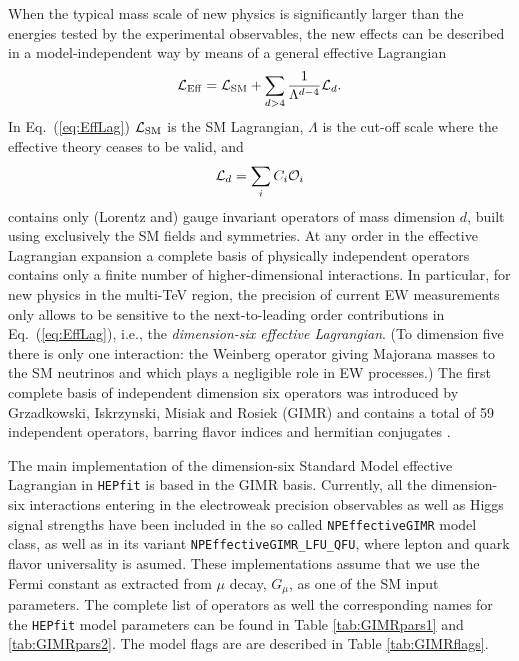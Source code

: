 \documentclass[preprint,3p,12pt]{elsarticle}
\begin{document}
{When the typical mass scale of new physics is significantly larger than the energies tested by the experimental observables, the new effects can be described in a model-independent way by means of a general effective Lagrangian
%
\begin{equation}
{\cal L}_{\mathrm{Eff}}={\cal L}_{\mathrm{SM}} + \sum_{d>4} \frac{1}{\Lambda^{d-4}}{\cal L}_d.
\label{eq:EffLag}
\end{equation}
%
In Eq.~(\ref{eq:EffLag}) ${\cal L}_{\mathrm{SM}}$ is the SM Lagrangian, $\Lambda$ is the cut-off scale where the effective theory ceases to be valid, and
%
\begin{equation}
{\cal L}_d=\sum_i C_i {\cal O}_i
\end{equation}
%
contains only (Lorentz and) gauge invariant operators of mass dimension $d$, built using exclusively the SM fields and symmetries. At any order in the effective Lagrangian expansion a complete basis of physically independent operators contains only a finite number of higher-dimensional interactions. In particular, for new physics in the multi-TeV region, the precision of current EW measurements only allows to be sensitive to the next-to-leading order contributions in  Eq.~(\ref{eq:EffLag}), i.e., the {\it dimension-six effective Lagrangian}. (To dimension five there is only one interaction: the Weinberg operator giving Majorana masses to the SM neutrinos and which plays a negligible role in EW processes.)
The first complete basis of independent dimension six operators was introduced by Grzadkowski, Iskrzynski, Misiak and Rosiek (GIMR) and contains a total of 59 independent operators, barring flavor indices and hermitian conjugates \cite{Grzadkowski:2010es}.

The main implementation of the dimension-six Standard Model effective Lagrangian in {\tt HEPfit} is based in the GIMR basis. Currently, all the dimension-six interactions entering in the electroweak precision observables as well as Higgs signal strengths have been included in the so called {\tt NPEffectiveGIMR} model class, as well as in its variant {\tt NPEffectiveGIMR\_LFU\_QFU}, where lepton and quark flavor universality is asumed. These implementations assume that we use the Fermi constant as extracted from $\mu$ decay, $G_\mu$, as one of the SM input parameters. The complete list of operators as well the corresponding names for the {\tt HEPfit} model parameters can be found in Table \ref{tab:GIMRpars1} and \ref{tab:GIMRpars2}. The model flags are are described in Table \ref{tab:GIMRflags}.


}
\end{document}
